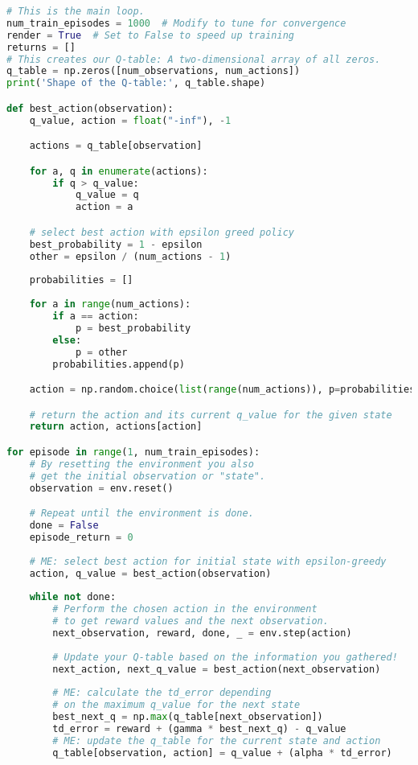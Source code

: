 \documentclass[a4paper, 11pt]{article}
\begin{document}
\begin{lstlisting}[language=Python]
# This is the main loop.
num_train_episodes = 1000  # Modify to tune for convergence
render = True  # Set to False to speed up training
returns = []
# This creates our Q-table: A two-dimensional array of all zeros.
q_table = np.zeros([num_observations, num_actions])
print('Shape of the Q-table:', q_table.shape)

def best_action(observation):
    q_value, action = float("-inf"), -1

    actions = q_table[observation]

    for a, q in enumerate(actions):
        if q > q_value:
            q_value = q
            action = a

    # select best action with epsilon greed policy
    best_probability = 1 - epsilon
    other = epsilon / (num_actions - 1)
    
    probabilities = []
    
    for a in range(num_actions):
        if a == action:
            p = best_probability
        else:
            p = other
        probabilities.append(p)

    action = np.random.choice(list(range(num_actions)), p=probabilities)

    # return the action and its current q_value for the given state
    return action, actions[action]

for episode in range(1, num_train_episodes):
    # By resetting the environment you also 
    # get the initial observation or "state".
    observation = env.reset()

    # Repeat until the environment is done.
    done = False
    episode_return = 0
    
    # ME: select best action for initial state with epsilon-greedy
    action, q_value = best_action(observation) 
    
    while not done:
        # Perform the chosen action in the environment 
        # to get reward values and the next observation.
        next_observation, reward, done, _ = env.step(action)
        
        # Update your Q-table based on the information you gathered!
        next_action, next_q_value = best_action(next_observation) 
        
        # ME: calculate the td_error depending 
        # on the maximum q_value for the next state
        best_next_q = np.max(q_table[next_observation])
        td_error = reward + (gamma * best_next_q) - q_value
        # ME: update the q_table for the current state and action
        q_table[observation, action] = q_value + (alpha * td_error)
        

\end{lstlisting}
\end{document}

